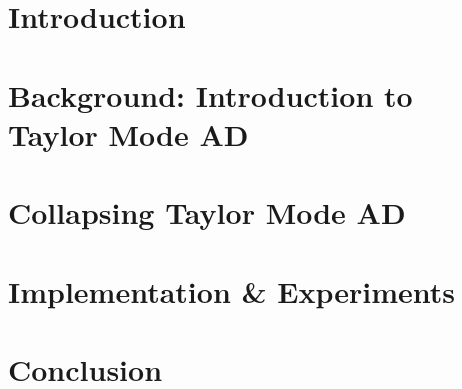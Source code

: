 \documentclass{article}
\begin{document}
\maketitle

\begin{abstract}
  Computing partial differential equation (PDE) operators via nested backpropagation is expensive, yet popular, and severely restricts their utility for scientific machine learning.
  Recent advances, like the forward Laplacian and randomizing Taylor mode automatic differentiation (AD), propose forward schemes to address this.
  We introduce an optimization technique for Taylor mode that ``collapses''  derivatives by rewriting the computational graph, and demonstrate how to apply it to general linear PDE operators, and randomized Taylor mode.
  The modifications simply require propagating a sum up the computational graph, which could---or should---be done by a machine learning compiler, without exposing complexity to users.
  We implement our collapsing procedure and evaluate it on popular PDE operators, confirming it accelerates Taylor mode and outperforms nested backpropagation.
\end{abstract}

\section{Introduction}\label{sec:introduction}


\section{Background: Introduction to Taylor Mode AD}\label{sec:background}


\section{Collapsing Taylor Mode AD}\label{sec:methodology}


\section{Implementation \& Experiments}\label{sec:experiments}


\section{Conclusion}\label{sec:conclusion}

\end{document}
